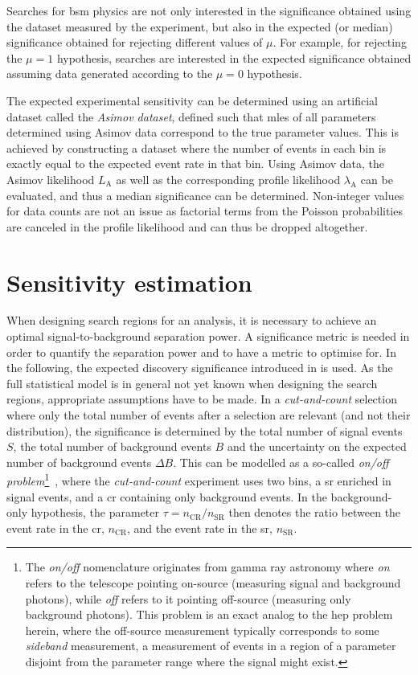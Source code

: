 Searches for \gls{bsm} physics are not only interested in the significance obtained using the dataset measured by the experiment, but also in the expected (or median) significance obtained for rejecting different values of $\mu$.
For example, for rejecting the $\mu = 1$ hypothesis, searches are interested in the expected significance obtained assuming data generated according to the $\mu = 0$ hypothesis.

The expected experimental sensitivity can be determined using an artificial dataset called the \textit{Asimov dataset}, defined such that \glspl{mle} of all parameters determined using Asimov data correspond to the true parameter values.
This is achieved by constructing a dataset where the number of events in each bin is exactly equal to the expected event rate in that bin. Using Asimov data, the Asimov likelihood $L_\mathrm{A}$ as well as the corresponding profile likelihood $\lambda_\mathrm{A}$ can be evaluated, and thus a median significance can be determined.
Non-integer values for data counts are not an issue as factorial terms from the Poisson probabilities are canceled in the profile likelihood and can thus be dropped altogether. 

\section{Sensitivity estimation}\label{sec:sensitivity_estimation}

When designing search regions for an analysis, it is necessary to achieve an optimal signal-to-background separation power.
A significance metric is needed in order to quantify the separation power and to have a metric to optimise for.
In the following, the expected discovery significance introduced in \cite{Cousins:2007bmb} is used. As the full statistical model is in general not yet known when designing the search regions, appropriate assumptions have to be made. In a \textit{cut-and-count} selection where only the total number of events after a selection are relevant (and not \eg their distribution), the significance is determined by the total number of signal events $S$, the total number of background events $B$ and the uncertainty on the expected number of background events $\Delta B$.
This can be modelled as a so-called \textit{on/off problem}\footnote{The \textit{on/off} nomenclature originates from gamma ray astronomy where \textit{on} refers to the telescope pointing on-source (measuring signal and background photons), while \textit{off} refers to it pointing off-source (measuring only background photons). This problem is an exact analog to the \gls{hep} problem herein, where the off-source measurement typically corresponds to some \textit{sideband} measurement, \ie a measurement of events in a region of a parameter disjoint from the parameter range where the signal might exist.}~\cite{Cousins:2007bmb, Cranmer:2005hi}, where the \textit{cut-and-count} experiment uses two bins, a \gls{sr} enriched in signal events, and a \gls{cr} containing only background events.
In the background-only hypothesis, the parameter $\tau = n_\mathrm{CR} / n_\mathrm{SR}$ then denotes the ratio between the event rate in the \gls{cr}, $n_\mathrm{CR}$, and the event rate in the \gls{sr}, $n_\mathrm{SR}$.

